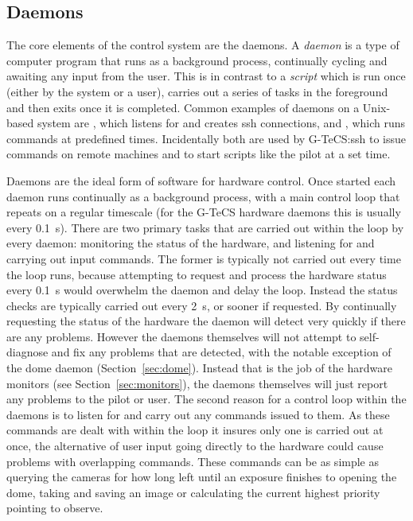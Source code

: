 \begin{colsection}
\begin{colsection}
\end{colsection}


\subsection{Daemons}
\label{sec:daemons}
\begin{colsection}

The core elements of the control system are the daemons. A \emph{daemon} is a type of computer program that runs as a background process, continually cycling and awaiting any input from the user. This is in contrast to a \emph{script} which is run once (either by the system or a user), carries out a series of tasks in the foreground and then exits once it is completed. Common examples of daemons on a Unix-based system are , which listens for and creates \gls{ssh} connections, and , which runs commands at predefined times. Incidentally both are used by G-TeCS:\@ \gls{ssh} to issue commands on remote machines and  to start scripts like the pilot at a set time.

Daemons are the ideal form of software for hardware control. Once started each daemon runs continually as a background process, with a main control loop that repeats on a regular timescale (for the G-TeCS hardware daemons this is usually every \SI{0.1}{\second}). There are two primary tasks that are carried out within the loop by every daemon: monitoring the status of the hardware, and listening for and carrying out input commands. The former is typically not carried out every time the loop runs, because attempting to request and process the hardware status every \SI{0.1}{\second} would overwhelm the daemon and delay the loop. Instead the status checks are typically carried out every \SI{2}{\second}, or sooner if requested. By continually requesting the status of the hardware the daemon will detect very quickly if there are any problems. However the daemons themselves will not attempt to self-diagnose and fix any problems that are detected, with the notable exception of the dome daemon (Section~\ref{sec:dome}). Instead that is the job of the hardware monitors (see Section~\ref{sec:monitors}), the daemons themselves will just report any problems to the pilot or user. The second reason for a control loop within the daemons is to listen for and carry out any commands issued to them. As these commands are dealt with within the loop it insures only one is carried out at once, the alternative of user input going directly to the hardware could cause problems with overlapping commands. These commands can be as simple as querying the cameras for how long left until an exposure finishes to opening the dome, taking and saving an image or calculating the current highest priority pointing to observe.


\end{colsection}
\end{colsection}

